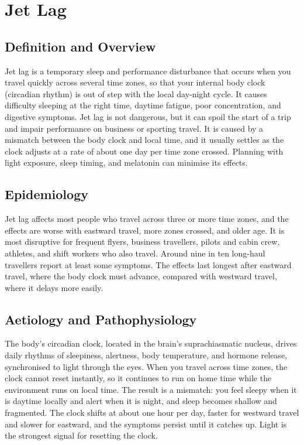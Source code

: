 \chapter{Jet Lag}

\section*{Definition and Overview}
Jet lag is a temporary sleep and performance disturbance that occurs when you travel quickly across several time zones, so that your internal body clock (circadian rhythm) is out of step with the local day-night cycle. It causes difficulty sleeping at the right time, daytime fatigue, poor concentration, and digestive symptoms. Jet lag is not dangerous, but it can spoil the start of a trip and impair performance on business or sporting travel. It is caused by a mismatch between the body clock and local time, and it usually settles as the clock adjusts at a rate of about one day per time zone crossed. Planning with light exposure, sleep timing, and melatonin can minimise its effects.

\section*{Epidemiology}
Jet lag affects most people who travel across three or more time zones, and the effects are worse with eastward travel, more zones crossed, and older age. It is most disruptive for frequent flyers, business travellers, pilots and cabin crew, athletes, and shift workers who also travel. Around nine in ten long-haul travellers report at least some symptoms. The effects last longest after eastward travel, where the body clock must advance, compared with westward travel, where it delays more easily.

\section*{Aetiology and Pathophysiology}
The body's circadian clock, located in the brain's suprachiasmatic nucleus, drives daily rhythms of sleepiness, alertness, body temperature, and hormone release, synchronised to light through the eyes. When you travel across time zones, the clock cannot reset instantly, so it continues to run on home time while the environment runs on local time. The result is a mismatch: you feel sleepy when it is daytime locally and alert when it is night, and sleep becomes shallow and fragmented. The clock shifts at about one hour per day, faster for westward travel and slower for eastward, and the symptoms persist until it catches up. Light is the strongest signal for resetting the clock.

